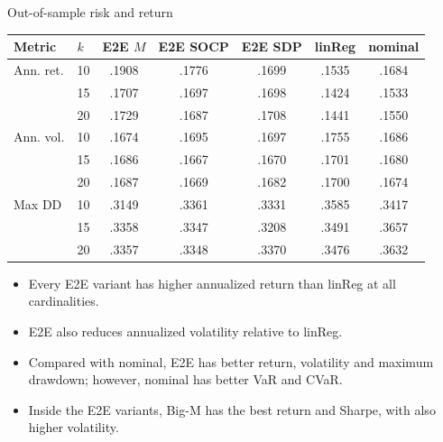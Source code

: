 \documentclass[10pt,aspectratio=169]{beamer}
\newcommand{\Kcard}{k}
\begin{document}
\begin{frame}{Out-of-sample risk and return}
  \centering\footnotesize
  \begin{tabular}{llccccc}
    \toprule
    Metric & $\Kcard$ & E2E $M$ & E2E SOCP & E2E SDP & linReg & nominal \\
    \midrule
    Ann. ret. & 10 & .1908 & .1776 & .1699 & .1535 & .1684 \\
              & 15 & .1707 & .1697 & .1698 & .1424 & .1533 \\
              & 20 & .1729 & .1687 & .1708 & .1441 & .1550 \\
    \midrule
    Ann. vol. & 10 & .1674 & .1695 & .1697 & .1755 & .1686 \\
              & 15 & .1686 & .1667 & .1670 & .1701 & .1680 \\
              & 20 & .1687 & .1669 & .1682 & .1700 & .1674 \\
    \midrule
    Max DD    & 10 & .3149 & .3361 & .3331 & .3585 & .3417 \\
              & 15 & .3358 & .3347 & .3208 & .3491 & .3657 \\
              & 20 & .3357 & .3348 & .3370 & .3476 & .3632 \\
    \bottomrule
  \end{tabular}

  \vspace{.2em}
  \begin{itemize}
    \item Every E2E variant has higher annualized return than linReg at all cardinalities.
    \item E2E also reduces annualized volatility relative to linReg.
    \item Compared with nominal, E2E has better return, volatility and maximum drawdown; however, nominal has better VaR and CVaR.
    \item Inside the E2E variants, Big-M has the best return and Sharpe, with also higher volatility.
  \end{itemize}
\end{frame}
\end{document}
